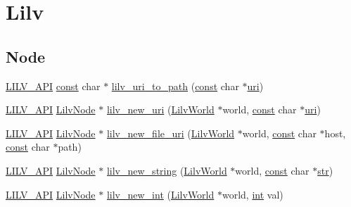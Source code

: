\hypertarget{group__lilv}{}\section{Lilv}
\label{group__lilv}
\subsection*{Node}
\begin{DoxyCompactItemize}
\item 
\hyperlink{lilv_8h_aa5182eee7ddff96862d0171967ee6f77}{L\+I\+L\+V\+\_\+\+A\+PI} \hyperlink{getopt1_8c_a2c212835823e3c54a8ab6d95c652660e}{const} char $\ast$ \hyperlink{group__lilv_gada8ce596e1147a59d1711444c197a23d}{lilv\+\_\+uri\+\_\+to\+\_\+path} (\hyperlink{getopt1_8c_a2c212835823e3c54a8ab6d95c652660e}{const} char $\ast$\hyperlink{lib_2expat_8h_a5a9fdd6c2606370ad12f24c078ac6585}{uri})
\item 
\hyperlink{lilv_8h_aa5182eee7ddff96862d0171967ee6f77}{L\+I\+L\+V\+\_\+\+A\+PI} \hyperlink{lilv_8h_ae183dca3dca5368d34dbd863a405437b}{Lilv\+Node} $\ast$ \hyperlink{group__lilv_gaadc0a9397da39725b2aa7030dfea7786}{lilv\+\_\+new\+\_\+uri} (\hyperlink{lilv_8h_a91c1745aa6ffca2b6b87c56df6c5ab86}{Lilv\+World} $\ast$world, \hyperlink{getopt1_8c_a2c212835823e3c54a8ab6d95c652660e}{const} char $\ast$\hyperlink{lib_2expat_8h_a5a9fdd6c2606370ad12f24c078ac6585}{uri})
\item 
\hyperlink{lilv_8h_aa5182eee7ddff96862d0171967ee6f77}{L\+I\+L\+V\+\_\+\+A\+PI} \hyperlink{lilv_8h_ae183dca3dca5368d34dbd863a405437b}{Lilv\+Node} $\ast$ \hyperlink{group__lilv_ga84663ba7913d9558a163b835035b606f}{lilv\+\_\+new\+\_\+file\+\_\+uri} (\hyperlink{lilv_8h_a91c1745aa6ffca2b6b87c56df6c5ab86}{Lilv\+World} $\ast$world, \hyperlink{getopt1_8c_a2c212835823e3c54a8ab6d95c652660e}{const} char $\ast$host, \hyperlink{getopt1_8c_a2c212835823e3c54a8ab6d95c652660e}{const} char $\ast$path)
\item 
\hyperlink{lilv_8h_aa5182eee7ddff96862d0171967ee6f77}{L\+I\+L\+V\+\_\+\+A\+PI} \hyperlink{lilv_8h_ae183dca3dca5368d34dbd863a405437b}{Lilv\+Node} $\ast$ \hyperlink{group__lilv_ga579adb7c7e071bf43d8775e48e6edc06}{lilv\+\_\+new\+\_\+string} (\hyperlink{lilv_8h_a91c1745aa6ffca2b6b87c56df6c5ab86}{Lilv\+World} $\ast$world, \hyperlink{getopt1_8c_a2c212835823e3c54a8ab6d95c652660e}{const} char $\ast$\hyperlink{sndfile__save_8m_a4b99ff73a8a869319570237b5c57ab03}{str})
\item 
\hyperlink{lilv_8h_aa5182eee7ddff96862d0171967ee6f77}{L\+I\+L\+V\+\_\+\+A\+PI} \hyperlink{lilv_8h_ae183dca3dca5368d34dbd863a405437b}{Lilv\+Node} $\ast$ \hyperlink{group__lilv_ga2d87a9716a851a2a2f84771875ea2c6b}{lilv\+\_\+new\+\_\+int} (\hyperlink{lilv_8h_a91c1745aa6ffca2b6b87c56df6c5ab86}{Lilv\+World} $\ast$world, \hyperlink{xmltok_8h_a5a0d4a5641ce434f1d23533f2b2e6653}{int} val)

\end{DoxyCompactItemize}
